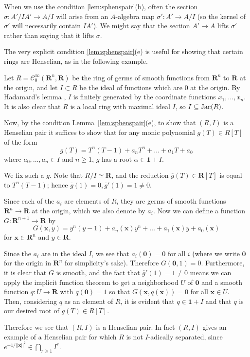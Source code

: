 \documentclass[12pt]{article}
\newcommand{\R}{\mathbf{R}}
\newcommand{\Jac}{{\rm Jac}}
\newcommand{\ol}[1]{\overline{#1}}
\newcommand{\mc}[1]{\mathcal{#1}}
\theoremstyle{definition}
\newenvironment{example}
  {\pushQED{\qed}\renewcommand{\qedsymbol}{$\blacksquare$}\examplex}
  {\popQED\endexamplex}
\numberwithin{equation}{subsection}
\begin{document}
When we use the condition \ref{lem:sphenspair}(b), often the section $\sigma: A'/IA' \to A/I$ will arise from an $A$-algebra map $\sigma': A' \to A/I$ (so the kernel of $\sigma'$ will necessarily contain $IA'$). We might say that the section $A' \to A$ lifts $\sigma'$ rather than saying that it lifts $\sigma$. 

The very explicit condition \ref{lem:sphenspair}(e) is useful for showing that certain rings are Henselian, as in the following example. 

\begin{example}\label{ex:hensnotsep}

Let $R=\mc{C}_0^\infty(\R^n,\R)$ be the ring of germs of smooth functions from $\R^n$ to $\R$ at the origin, and let $I \subset R$ be the ideal of functions which are $0$ at the origin. By Hadamard's lemma \cite[]{hadcite}, $I$ is finitely generated by the coordinate functions $x_1,\dots,x_n$. It is also clear that $R$ is a local ring with maximal ideal $I$, so $I\subseteq\Jac(R)$. 


Now, by the condition Lemma~\ref{lem:sphenspair}(e), to show that $(R,I)$ is a Henselian pair it suffices to show that for any monic polynomial $g(T) \in R[T]$ of the form $$g(T) = T^ n(T - 1) + a_ n T^ n + \ldots + a_1 T + a_0$$ where $a_0,\dots,a_n \in I$ and $n \ge 1$, $g$ has a root $\alpha \in \mathbf{1}+I$.

We fix such a $g$. Note that $R/I \simeq \R$, and the reduction $\ol{g}(T) \in \R[T]$ is equal to $T^n(T-1)$; hence $\ol{g}(1)=0, \ol{g}'(1)=1 \ne 0$. 

Since each of the $a_i$ are elements of $R$, they are germs of smooth functions $\R^n \to \R$ at the origin, which we also denote by $a_i$. Now we can define a function $G: \R^{n+1} \to \R$ by $$G(\mathbf{x},y)=y^n(y-1) + a_ n(\mathbf{x}) y^ n + \ldots + a_1(\mathbf{x}) y + a_0(\mathbf{x})$$ for $\mathbf{x} \in \R^n$ and $y \in \R$. 

Since the $a_i$ are in the ideal $I$, we see that $a_i(\mathbf{0})=0$ for all $i$ (where we write $\mathbf{0}$ for the origin in $\R^n$ for simplicity's sake).  Therefore $G(\mathbf{0},1)=0$. Furthermore, it is clear that $G$ is smooth, and the fact that $\ol{g}'(1)=1 \ne 0$ means we can apply the implicit function theorem to get a neighborhood $U$ of $\mathbf{0}$ and a smooth function $q: U \to \R$ with $q(\mathbf{0})=1$ so that $G(\mathbf{x},q(\mathbf{x}))=0$ for all $\mathbf{x} \in U$. Then, considering $q$ as an element of $R$, it is evident that $q \in \mathbf{1}+I$ and that $q$ is our desired root of $g(T) \in R[T]$. 

Therefore we see that $(R,I)$ is a Henselian pair. In fact $(R,I)$ gives an example of a Henselian pair for which $R$ is not $I$-adically separated, since $e^{-1/||\mathbf{x}||^2} \in \bigcap_{r \ge 1} I^r$. \end{example}
\end{document}
